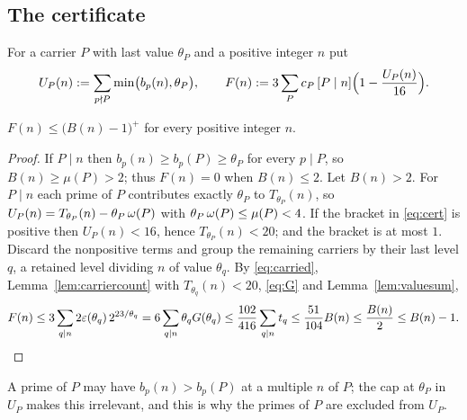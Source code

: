 \subsection*{The certificate}

For a carrier $P$ with last value $\theta_P$ and a positive integer $n$ put
\begin{equation}\label{eq:cert}
U_P(n):=\sum_{p\nmid P}\min\bigl(b_p(n),\theta_P\bigr),\qquad
F(n):=3\sum_Pc_P\,[P\mid n]\Bigl(1-\frac{U_P(n)}{16}\Bigr).
\end{equation}

\begin{lemma}\label{lem:feasible}
$F(n)\le\bigl(B(n)-1\bigr)^+$ for every positive integer $n$.
\end{lemma}
\begin{proof}
If $P\mid n$ then $b_p(n)\ge b_p(P)\ge\theta_P$ for every $p\mid P$, so $B(n)\ge\mu(P)>2$; thus $F(n)=0$ when $B(n)\le2$. Let $B(n)>2$.
For $P\mid n$ each prime of $P$ contributes exactly $\theta_P$ to $T_{\theta_P}(n)$, so $U_P(n)=T_{\theta_P}(n)-\theta_P\operatorname{\omega}(P)$ with
$\theta_P\operatorname{\omega}(P)\le\mu(P)<4$. If the bracket in \eqref{eq:cert} is positive then $U_P(n)<16$, hence $T_{\theta_P}(n)<20$; and the bracket is
at most $1$. Discard the nonpositive terms and group the remaining carriers by their last level $q$, a retained level dividing $n$ of
value $\theta_q$. By \eqref{eq:carried}, Lemma~\ref{lem:carriercount} with $T_{\theta_q}(n)<20$, \eqref{eq:G} and Lemma~\ref{lem:valuesum},
\[
F(n)\le3\sum_{q\mid n}2\varepsilon(\theta_q)\,2^{23/\theta_q}=6\sum_{q\mid n}\theta_qG(\theta_q)\le\frac{102}{416}\sum_{q\mid n}t_q
\le\frac{51}{104}B(n)\le\frac{B(n)}2\le B(n)-1 . \qedhere
\]
\end{proof}

A prime of $P$ may have $b_p(n)>b_p(P)$ at a multiple $n$ of $P$; the cap at $\theta_P$ in $U_P$ makes this irrelevant, and this is why
the primes of $P$ are excluded from $U_P$.

